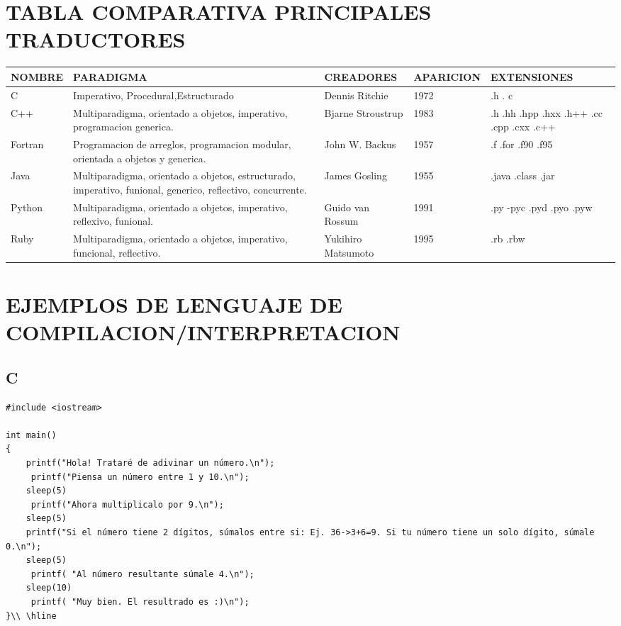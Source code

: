 \documentclass[11pt]{article}
\begin{document}
\section{TABLA COMPARATIVA PRINCIPALES TRADUCTORES} 
 \begin{tabular}{|p{2.0cm}|p{4.0cm}|p{2.0cm}|p{2.0cm}|p{3.0cm}|}
 \hline
 NOMBRE & PARADIGMA & CREADORES & APARICION & EXTENSIONES \\ \hline
 C & Imperativo, Procedural,Estructurado & Dennis Ritchie & 1972 & .h . c \\ \hline 
C++ & Multiparadigma, orientado a objetos, imperativo, programacion generica. & Bjarne Stroustrup & 1983& .h .hh .hpp .hxx .h++ .cc .cpp .cxx .c++ \\ \hline
Fortran & Programacion de arreglos, programacion modular, orientada a objetos y generica. & John W. Backus & 1957 & .f .for .f90 .f95\\ \hline
Java & Multiparadigma, orientado a objetos, estructurado, imperativo, funional, generico, reflectivo, concurrente. & James Gosling & 1955 & .java .class .jar\\ \hline
Python & Multiparadigma, orientado a objetos, imperativo, reflexivo, funional. & Guido van Rossum & 1991 & .py -pyc .pyd .pyo .pyw\\ \hline
Ruby & Multiparadigma, orientado a objetos, imperativo, funcional, reflectivo. & Yukihiro Matsumoto & 1995 & .rb .rbw\\ \hline

 \hline
\end{tabular}
\section{EJEMPLOS DE LENGUAJE DE COMPILACION/INTERPRETACION} 
\subsection*{C}
\begin{verbatim}#include <iostream>
 
int main()
{
    printf("Hola! Trataré de adivinar un número.\n");
     printf("Piensa un número entre 1 y 10.\n");
    sleep(5)	
     printf("Ahora multiplicalo por 9.\n");
    sleep(5)
    printf("Si el número tiene 2 dígitos, súmalos entre si: Ej. 36->3+6=9. Si tu número tiene un solo dígito, súmale 0.\n");
    sleep(5)
     printf( "Al número resultante súmale 4.\n");
    sleep(10)	
     printf( "Muy bien. El resultrado es :)\n"); 
}\\ \hline
\end{verbatim}
\end{document}
